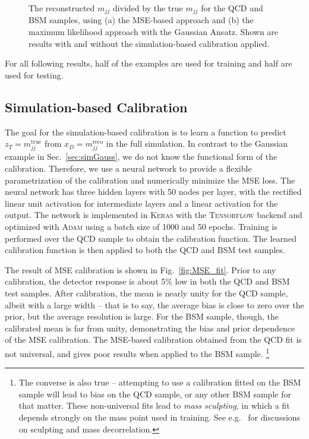 \documentclass[aps,prd,reprint,preprintnumbers,superscriptaddress,nofootinbib,longbibliography,floatfix]{revtex4-1}
\DeclareRobustCommand{\Sec}[1]{Sec.~\ref{sec:#1}}
\DeclareRobustCommand{\Fig}[1]{Fig.~\ref{fig:#1}}
\begin{document}
\begin{figure*}[t]
    \centering
    $\qquad$
    \caption{
    The reconstructed $m_{jj}$ divided by the true $m_{jj}$ for the QCD and BSM samples, using (a) the MSE-based approach and (b) the maximum likelihood approach with the Gaussian Ansatz.
    Shown are results with and without the simulation-based calibration applied.
    }
\end{figure*}

For all following results, half of the examples are used for training and half are used for testing.


\subsection{Simulation-based Calibration}




The goal for the simulation-based calibration is to learn a function to predict $z_T = m^{\text{true}}_{jj}$ from $x_D = m^{\text{reco}}_{jj}$ in the full simulation.
%
In contrast to the Gaussian example in \Sec{simGauss}, we do not know the functional form of the calibration.
%
Therefore, we use a neural network to provide a flexible parametrization of the calibration and numerically minimize the MSE loss.
%
The neural network has three hidden layers with 50 nodes per layer, with the rectified linear unit activation for intermediate layers and a linear activation for the output.
%
The network is implemented in \textsc{Keras} with the \textsc{Tensorflow} backend and optimized with \textsc{Adam} using a batch size of 1000 and 50 epochs.
%
Training is performed over the QCD sample to obtain the calibration function.
%
The learned calibration function is then applied to both the QCD and BSM test samples. 


The result of MSE calibration is shown in \Fig{MSE_fit}.
%
Prior to any calibration, the detector response is about 5\% low in both the QCD and BSM test samples.
%
After calibration, the mean is nearly unity for the QCD sample, albeit with a large width -- that is to say, the average bias is close to zero over the prior, but the average resolution is large.
%
For the BSM sample, though, the calibrated mean is far from unity, demonstrating the bias and prior dependence of the MSE calibration.
%
The MSE-based calibration obtained from the QCD fit is not universal, and gives poor results when applied to the BSM sample.%
%
\footnote{The converse is also true -- attempting to use a calibration fitted on the BSM sample will lead to bias on the QCD sample, or any other BSM sample for that matter. These non-universal fits lead to \emph{mass sculpting}, in which a fit depends strongly on the mass point used in training. See e.g.~\cite{Kitouni_2021} for discussions on sculpting and mass decorrelation.}
\end{document}
